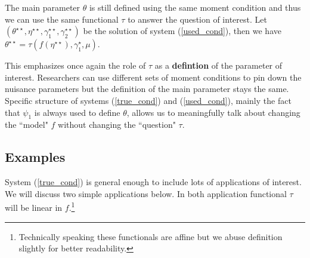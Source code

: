 \documentclass[12pt]{article}
\theoremstyle{plain}
\begin{document}
The main parameter $\theta$ is still defined using the same moment condition and thus we can use the same functional $\tau$ to answer the question of interest. Let $(\theta^{\star\star},\eta^{\star\star},\gamma_1^{\star\star}, \gamma_2^{\star\star})$ be the solution of system (\ref{used_cond}), then we have $\theta^{\star\star} = \tau(f(\eta^{\star\star}),\gamma_1^{\star},\mu)$. 

This emphasizes once again the role of $\tau$ as a \textbf{defintion} of the parameter of interest. Researchers can use different sets of moment conditions to pin down the nuisance parameters but the definition of the main parameter stays the same. Specific structure of systems (\ref{true_cond}) and (\ref{used_cond}), mainly the fact that $\psi_1$ is always used to define $\theta$, allows us to meaningfully talk about changing the ``model" $f$ without changing the ``question" $\tau$.



\subsection{Examples}
System (\ref{true_cond}) is general enough to include lots of applications of interest. We will discuss two simple applications below. In both application functional $\tau$ will be linear in $f$.\footnote{Technically speaking these functionals are affine but we abuse definition slightly for better readability.}
\end{document}
